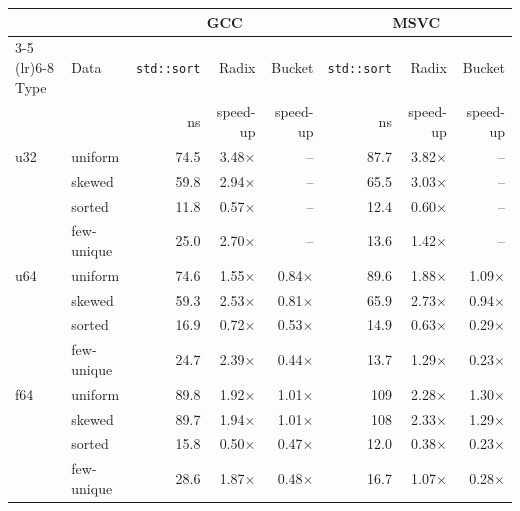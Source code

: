 \begin{tabular}{llrrrrrr}
\toprule
 & & \multicolumn{3}{c}{GCC} & \multicolumn{3}{c}{MSVC}\\
\cmidrule(lr){3-5} \cmidrule(lr){6-8}
Type & Data & \texttt{std::sort} & Radix & Bucket & \texttt{std::sort} & Radix & Bucket\\
 & & ns & speed-up & speed-up & ns & speed-up & speed-up\\
\midrule
u32 & uniform & 74.5 & 3.48$\times$ & -- & 87.7 & 3.82$\times$ & --\\
 & skewed & 59.8 & 2.94$\times$ & -- & 65.5 & 3.03$\times$ & --\\
 & sorted & 11.8 & 0.57$\times$ & -- & 12.4 & 0.60$\times$ & --\\
 & few-unique & 25.0 & 2.70$\times$ & -- & 13.6 & 1.42$\times$ & --\\
\midrule
u64 & uniform & 74.6 & 1.55$\times$ & 0.84$\times$ & 89.6 & 1.88$\times$ & 1.09$\times$\\
 & skewed & 59.3 & 2.53$\times$ & 0.81$\times$ & 65.9 & 2.73$\times$ & 0.94$\times$\\
 & sorted & 16.9 & 0.72$\times$ & 0.53$\times$ & 14.9 & 0.63$\times$ & 0.29$\times$\\
 & few-unique & 24.7 & 2.39$\times$ & 0.44$\times$ & 13.7 & 1.29$\times$ & 0.23$\times$\\
\midrule
f64 & uniform & 89.8 & 1.92$\times$ & 1.01$\times$ & 109 & 2.28$\times$ & 1.30$\times$\\
 & skewed & 89.7 & 1.94$\times$ & 1.01$\times$ & 108 & 2.33$\times$ & 1.29$\times$\\
 & sorted & 15.8 & 0.50$\times$ & 0.47$\times$ & 12.0 & 0.38$\times$ & 0.23$\times$\\
 & few-unique & 28.6 & 1.87$\times$ & 0.48$\times$ & 16.7 & 1.07$\times$ & 0.28$\times$\\
\bottomrule
\end{tabular}
